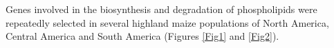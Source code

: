 \documentclass[9pt,twocolumn,twoside,lineno]{biorxiv}
\begin{document}

Genes involved in the biosynthesis and degradation of phospholipids were repeatedly selected in several highland maize populations of North America, Central America and South America (Figures \ref{Fig1} and \ref{Fig2}). 
\end{document}
